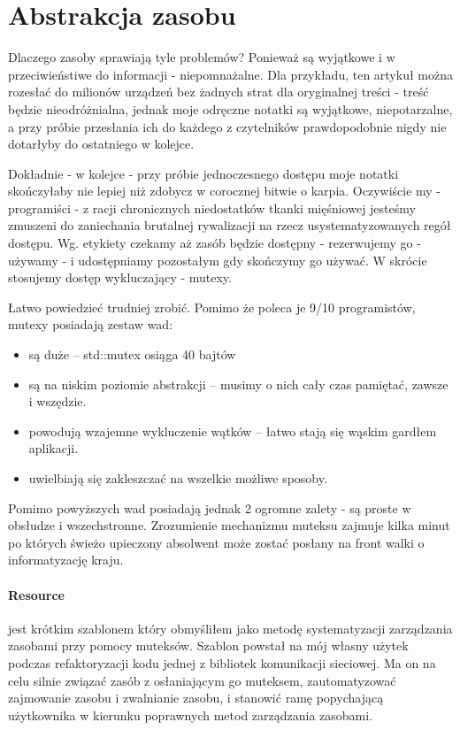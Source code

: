 \section{Abstrakcja zasobu}\label{sec:resource}
Dlaczego zasoby sprawiają tyle problemów? Ponieważ są wyjątkowe i w przeciwieństiwe do informacji - niepomnażalne. Dla przykładu, ten artykuł można rozesłać do milionów urządzeń bez żadnych strat dla oryginalnej treści - treść będzie nieodróżnialna, jednak moje odręczne notatki są wyjątkowe, niepotarzalne, a przy próbie przesłania ich do każdego z czytelników prawdopodobnie nigdy nie dotarłyby do ostatniego w kolejce.

Dokładnie - w kolejce - przy próbie jednoczesnego dostępu moje notatki skończyłaby nie lepiej niż zdobycz w corocznej bitwie o karpia. Oczywiście my - programiści - z racji chronicznych niedostatków tkanki mięśniowej jesteśmy zmuszeni do zaniechania brutalnej rywalizacji na rzecz usystematyzowanych regół dostępu. Wg. etykiety czekamy aż zasób będzie dostępny - rezerwujemy go - używamy - i udostępniamy pozostałym gdy skończymy go używać. W skrócie stosujemy dostęp wykluczający - mutexy.

Łatwo powiedzieć trudniej zrobić. Pomimo że poleca je 9/10 programistów, mutexy posiadają zestaw wad:
\begin{itemize}
\item są duże -- std::mutex osiąga 40 bajtów
\item są na niskim poziomie abstrakcji -- musimy o nich cały czas pamiętać, zawsze i wszędzie.
\item powodują wzajemne wykluczenie wątków -- łatwo stają się wąskim gardłem aplikacji.
\item uwielbiają się zakleszczać na wszelkie możliwe sposoby.
\end{itemize}
Pomimo powyższych wad posiadają jednak 2 ogromne zalety - są proste w obsłudze i wszechstronne. Zrozumienie mechanizmu muteksu zajmuje kilka minut po których świeżo upieczony absolwent może zostać posłany na front walki o informatyzację kraju.

\paragraph{Resource}
 jest krótkim szablonem który obmyśliłem jako metodę systematyzacji zarządzania zasobami przy pomocy muteksów. Szablon powstał na mój własny użytek podczas refaktoryzacji kodu jednej z bibliotek komunikacji sieciowej. Ma on na celu silnie związać zasób z osłaniającym go muteksem, zautomatyzować zajmowanie zasobu i zwalnianie zasobu, i stanowić ramę popychającą użytkownika w kierunku poprawnych metod zarządzania zasobami.

